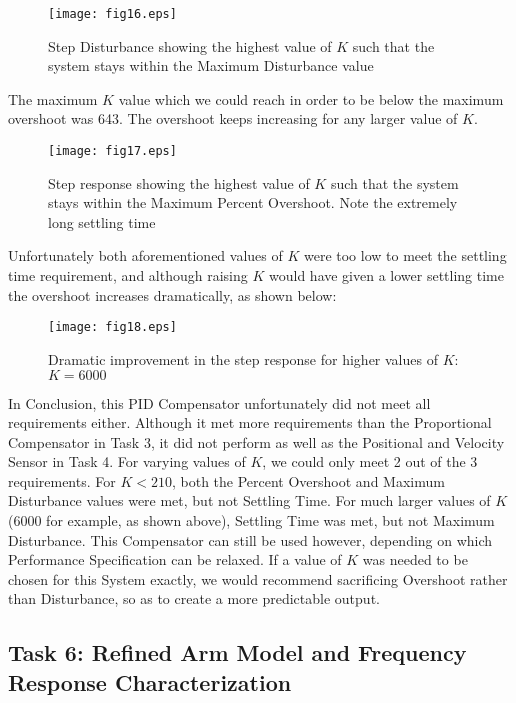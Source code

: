 \documentclass{article}
\newcommand{\matlab}[1]{%
%
}
\begin{document}
\matlab{fig16.m}

\begin{figure}[H]
  \caption{Step Disturbance showing the highest value of $K$ such that the
  system stays within the Maximum Disturbance value}
  \centering
  \texttt{[image: fig16.eps]}
\end{figure}

The maximum $K$ value which we could reach in order to be below
the maximum overshoot was 643. The overshoot keeps increasing for any larger
value of $K$. 

\matlab{fig17.m}

\begin{figure}[H]
  \caption{Step response showing the highest value of $K$ such that the
  system stays within the Maximum Percent Overshoot. Note the extremely long
  settling time}
  \centering
  \texttt{[image: fig17.eps]}
\end{figure}

Unfortunately both aforementioned values of $K$ were too low to
meet the settling time requirement, and although raising $K$ would have given
a lower settling time the overshoot increases dramatically, as shown below: 

\matlab{fig18.m}

\begin{figure}[H]
  \caption{Dramatic improvement in the step response for higher values of $K$:
  $K = 6000$}
  \centering
  \texttt{[image: fig18.eps]}
\end{figure}

In Conclusion, this PID Compensator unfortunately did not meet all requirements
either. Although it met more requirements than the Proportional Compensator in
Task 3, it did not perform as well as the Positional and Velocity Sensor in
Task 4. For varying values of $K$, we could only meet 2 out of the 3 requirements.
For $K < 210$, both the Percent Overshoot and Maximum Disturbance values were
met, but not Settling Time. For much larger values of $K$ (6000 for example,
as shown above), Settling Time was met, but not Maximum Disturbance. This 
Compensator can still be used however, depending on which Performance 
Specification can be relaxed. If a value of $K$ was needed to be chosen for 
this System exactly, we would recommend sacrificing Overshoot rather than
Disturbance, so as to create a more predictable output.

\subsection*{Task 6: Refined Arm Model and Frequency Response Characterization}
\end{document}
